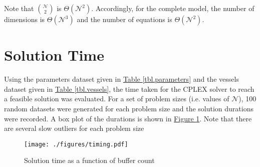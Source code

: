 Note that ${{\mathcal{N}}\choose{2}}$ is $\Theta \left( \mathcal{N}^2 \right)$.
Accordingly, for the complete model, the number of dimensions is 
$\Theta \left( \mathcal{N}^3 \right)$ and the number of equations is
$\Theta \left( \mathcal{N}^2 \right)$.

\section{Solution Time}\label{S.soltime}
Using the parameters dataset given in 
\hyperref[tbl.parameters]{Table \ref*{tbl.parameters}} and the vessels dataset
given in \hyperref[tbl.vessels]{Table \ref*{tbl.vessels}}, the time taken for
the CPLEX solver to reach a feasible solution was evaluated.
For a set of problem sizes (i.e. values of $\mathcal{N}$), 100 random datasets
were generated for each problem size and the solution durations were recorded.
A box plot of the durations is shown in 
\hyperref[fig.timing]{Figure \ref*{fig.timing}}.
Note that there are several slow outliers for each problem size


\begin{figure}
    \centering
    \texttt{[image: ./figures/timing.pdf]}
    \caption{Solution time as a function of buffer count}
    \label{fig.timing}
\end{figure}

